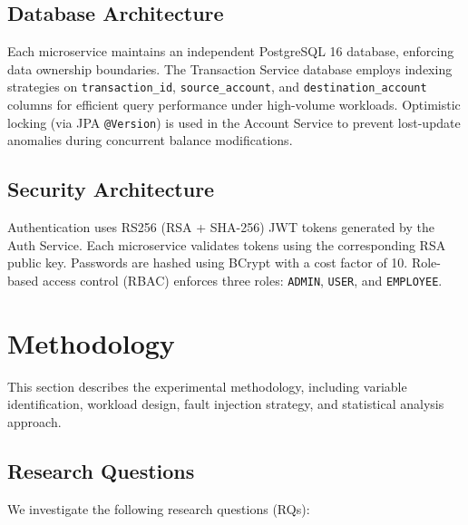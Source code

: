 \documentclass[journal]{IEEEtran}
\begin{document}
\subsection{Database Architecture}
\label{subsec:database_arch}

Each microservice maintains an independent PostgreSQL 16 database, enforcing data ownership boundaries. The Transaction Service database employs indexing strategies on \texttt{transaction\_id}, \texttt{source\_account}, and \texttt{destination\_account} columns for efficient query performance under high-volume workloads. Optimistic locking (via JPA \texttt{@Version}) is used in the Account Service to prevent lost-update anomalies during concurrent balance modifications.

\subsection{Security Architecture}
\label{subsec:security_arch}

Authentication uses RS256 (RSA + SHA-256) JWT tokens generated by the Auth Service. Each microservice validates tokens using the corresponding RSA public key. Passwords are hashed using BCrypt with a cost factor of 10. Role-based access control (RBAC) enforces three roles: \texttt{ADMIN}, \texttt{USER}, and \texttt{EMPLOYEE}.


\section{Methodology}
\label{sec:methodology}

This section describes the experimental methodology, including variable identification, workload design, fault injection strategy, and statistical analysis approach.

\subsection{Research Questions}
\label{subsec:research_questions}

We investigate the following research questions (RQs):
\end{document}
